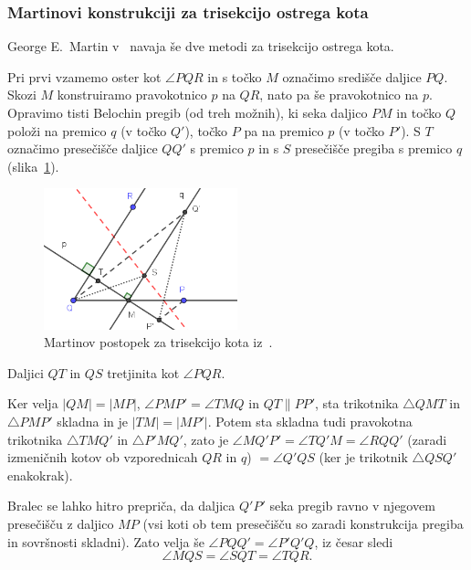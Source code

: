 \subsubsection*{Martinovi konstrukciji za trisekcijo ostrega kota}

George E.\ Martin v~\cite[poglavje 10]{geometricconstructions} navaja še dve metodi za trisekcijo ostrega kota.

Pri prvi vzamemo oster kot $\angle PQR$ in s točko $M$ označimo središče daljice $PQ$. Skozi $M$ konstruiramo pravokotnico $p$ na $QR$, nato pa še pravokotnico na $p$. Opravimo tisti Belochin pregib (od treh možnih), ki seka daljico $PM$ in točko $Q$ položi na premico $q$ (v točko $Q'$), točko $P$ pa na premico $p$ (v točko $P'$). S $T$ označimo presečišče daljice $QQ'$ s premico $p$ in s $S$ presečišče pregiba s premico $q$ (slika~\ref{fig:trisection_10.4}).

\begin{figure}[h]
    \centering
    \includegraphics[width=0.5\textwidth]{images/starogr_problemi/trisection_10.4.png}
    \caption[Martinova trisekcija ostrega kota (metoda $1$)]{Martinov postopek za trisekcijo kota iz~\cite[str.\ 154]{geometricconstructions}.}
    \label{fig:trisection_10.4}
\end{figure}

\begin{trditev}
    Daljici $QT$ in $QS$ tretjinita kot $\angle PQR$.
\end{trditev}
\begin{dokaz}
    Ker velja $|QM| = |MP|$, $\angle PMP' = \angle TMQ$ in $QT \parallel PP'$, sta trikotnika $\triangle QMT$ in $\triangle PMP'$ skladna in je $|TM| = |MP'|$. Potem sta skladna tudi pravokotna trikotnika $\triangle TMQ'$ in $\triangle P'MQ'$, zato je $\angle MQ'P' = \angle TQ'M = \angle RQQ'$ (zaradi izmeničnih kotov ob vzporednicah $QR$ in $q$) $= \angle Q'QS$ (ker je trikotnik $\triangle QSQ'$ enakokrak).
    
    Bralec se lahko hitro prepriča, da daljica $Q'P'$ seka pregib ravno v njegovem presečišču z daljico $MP$ (vsi koti ob tem presečišču so zaradi konstrukcija pregiba in sovršnosti skladni). Zato velja še $\angle PQQ' = \angle P'Q'Q$, iz česar sledi
    $$ \angle MQS = \angle SQT = \angle TQR.$$
\end{dokaz}


